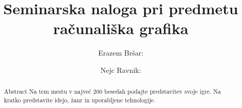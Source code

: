 \documentclass[a4paper]{article}
\begin{document}
\title{Seminarska naloga pri predmetu računališka grafika}

\author{ \large {Erazem Bršar}:  
	\and \hspace*{-3em} \large{ Nejc Ravnik}:   } 

\maketitle


\begin{abstract}{Abstract}
Na tem mestu v največ 200 besedah podajte predstavitev svoje igre. Na kratko predstavite idejo, žanr in {upo\-ra\-blje\-ne} tehnologije.
\end{abstract}
\end{document}
